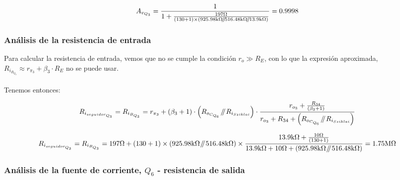 \begin{equation*}
A_{v_{Q_{3}}} = \frac{1}{1 + \frac { 197 \si[per-mode=symbol]{\ohm} }{  \left(  130 + 1 \right) \times \left(  925.98 \si[per-mode=symbol]{\kilo\ohm} \parallelresistors 516.48 \si[per-mode=symbol]{\kilo\ohm} \parallelresistors 13.9 \si[per-mode=symbol]{\kilo\ohm}  \right)  } } = 0.9998
\end{equation*}

\subsubsection{Análisis de la resistencia de entrada}


Para calcular la  resistencia de entrada, vemos que no se cumple la condición $r_{o} \gg R_{E}$, con lo que la expresión aproximada, $ R_{i_{B_{Q_{3}}}} \approx r_{\pi_{3}} + \beta_{3} \cdot R_{E}$ no se puede usar.\\ \\

Tenemos entonces:

\begin{equation}
R_{i_{seguidor_{Q_{3}}}} = R_{i_{B_{Q_{3}}}} = r_{\pi_{3}} + \left( \beta_{3} + 1 \right) \cdot  \left(  R_{o_{C_{Q_{6}}}} \parallelresistors R_{i_{Sziklai}}   \right)  \cdot \frac{  r_{o_{3}} + \frac{ R_{34} }{\left( \beta_{3} + 1 \right)} }{  r_{o_{3}} + R_{34} +  \left(  R_{o_{C_{Q_{6}}}} \parallelresistors R_{i_{Sziklai}}   \right)  }
\end{equation}


\begin{equation*}
R_{i_{seguidor_{Q_{3}}}} = R_{i_{B_{Q_{3}}}} = 197 \si[per-mode=symbol]{\ohm} + \left( 130 + 1 \right) \times \left(  925.98 \si[per-mode=symbol]{\kilo\ohm} \parallelresistors 516.48 \si[per-mode=symbol]{\kilo\ohm} \right)  \times \frac{  13.9 \si[per-mode=symbol]{\kilo\ohm} + \frac{ 10 \si[per-mode=symbol]{\ohm} }{\left( 130 + 1 \right)} }{  13.9 \si[per-mode=symbol]{\kilo\ohm} + 10 \si[per-mode=symbol]{\ohm} +  \left(  925.98 \si[per-mode=symbol]{\kilo\ohm} \parallelresistors 516.48 \si[per-mode=symbol]{\kilo\ohm} \right)  } = 1.75 \si[per-mode=symbol]{\mega\ohm} 
\end{equation*}


\subsubsection{Análisis de la fuente de corriente, $Q_{6}$ - resistencia de salida}

